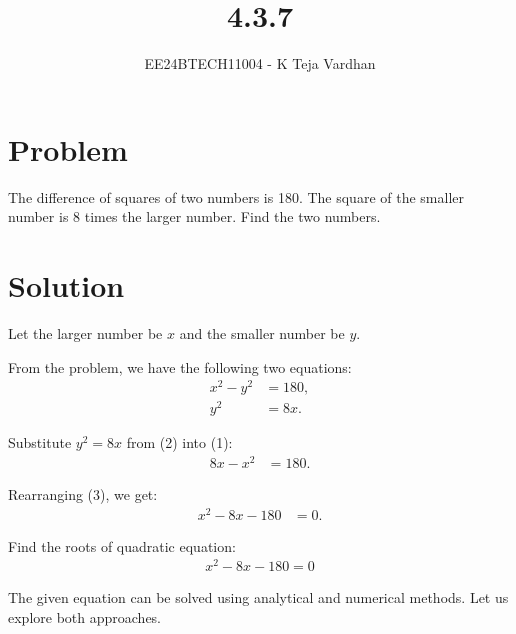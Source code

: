 \documentclass[journal]{IEEEtran}
\begin{document}

\vspace{3cm}

\title{4.3.7}
\author{EE24BTECH11004 - K Teja Vardhan}
\maketitle

\renewcommand{\thefigure}{\theenumi}
\renewcommand{\thetable}{\theenumi}
\setlength{\intextsep}{10pt}

\section*{Problem}
The difference of squares of two numbers is 180. The square of the smaller number is 8 times the larger number. Find the two numbers.

\section*{Solution}
Let the larger number be \( x \) and the smaller number be \( y \).

From the problem, we have the following two equations:
\begin{align}
x^2 - y^2 &= 180, \tag{1} \\
y^2 &= 8x. \tag{2}
\end{align}

Substitute \( y^2 = 8x \) from (2) into (1):
\begin{align}
8x - x^2 &= 180. \tag{3}
\end{align}

Rearranging (3), we get:
\begin{align}
x^2 - 8x - 180 &= 0. \tag{4}
\end{align}

Find the roots of quadratic equation:\
\begin{align}
    x^2 - 8x - 180 = 0
\end{align}

The given equation can be solved using analytical and numerical methods. Let us explore both approaches.
\end{document}
